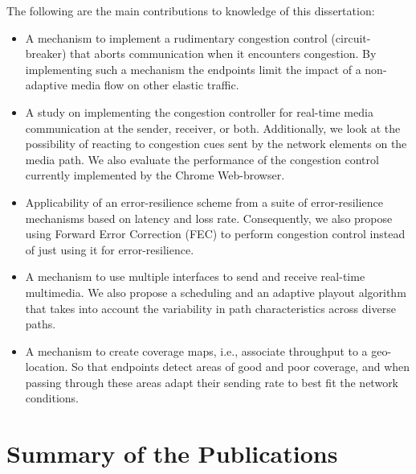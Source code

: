 The following are the main contributions to knowledge of this dissertation:

\begin{itemize}
\setlength{\itemsep}{0pt}


\item A mechanism to implement a rudimentary congestion control (circuit-
breaker) that aborts communication when it encounters congestion. By
implementing such a mechanism the endpoints limit the impact of a non-adaptive
media flow on other elastic traffic.

\item A study on implementing the congestion controller for real-time media
communication at the sender, receiver, or both. Additionally, we look at the
possibility of reacting to congestion cues sent by the network elements on the
media path. We also evaluate the performance of the congestion control
currently implemented by the Chrome Web-browser.

\item Applicability of an error-resilience scheme from a suite of
error-resilience mechanisms based on latency and loss rate. Consequently, we
also propose using Forward Error Correction (FEC) to perform congestion
control instead of just using it for error-resilience.

\item A mechanism to use multiple interfaces to send and receive real-time
multimedia. We also propose a scheduling and an adaptive playout algorithm
that takes into account the variability in path characteristics across diverse
paths.

\item A mechanism to create coverage maps, i.e., associate throughput to a
geo-location. So that endpoints detect areas of good and poor coverage, and
when passing through these areas adapt their sending rate to best fit the
network conditions.

\end{itemize}

\section{Summary of the Publications}

